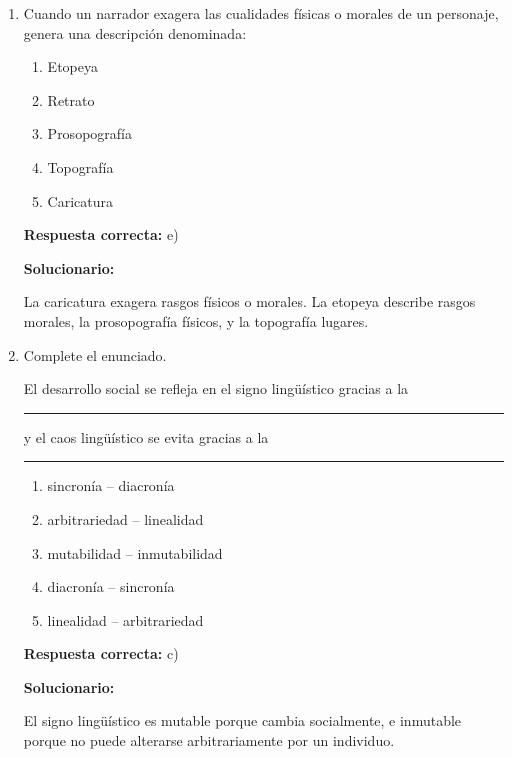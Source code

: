 \begin{enumerate}[resume]
	Ser idioma oficial significa que puede usarse legítimamente en ámbitos públicos e institucionales, dentro de su zona de predominio.
	
	\vspace{6mm}
	
	\item Cuando un narrador exagera las cualidades físicas o morales de un personaje, genera una descripción denominada:
	\begin{enumerate}[label=\alph*)]
		\item Etopeya
		\item Retrato
		\item Prosopografía
		\item Topografía
		\item Caricatura
	\end{enumerate}
	\textbf{Respuesta correcta:} e)
	
	\vspace{2mm}
	\textbf{Solucionario:}
	
	La caricatura exagera rasgos físicos o morales. La etopeya describe rasgos morales, la prosopografía físicos, y la topografía lugares.
	
	\vspace{6mm}
	
	\item Complete el enunciado.
	
	El desarrollo social se refleja en el signo lingüístico gracias a la \rule{2cm}{0.15mm} y el caos lingüístico se evita gracias a la \rule{2cm}{0.15mm}
	\begin{enumerate}[label=\alph*)]
		\item sincronía -- diacronía
		\item arbitrariedad -- linealidad
		\item mutabilidad -- inmutabilidad
		\item diacronía -- sincronía
		\item linealidad -- arbitrariedad
	\end{enumerate}
	\textbf{Respuesta correcta:} c)
	
	\vspace{2mm}
	\textbf{Solucionario:}
	
	El signo lingüístico es mutable porque cambia socialmente, e inmutable porque no puede alterarse arbitrariamente por un individuo.
	
	\vspace{6mm}
	
\end{enumerate}

